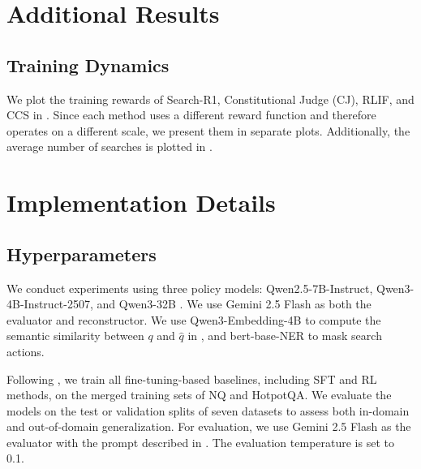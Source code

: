 \appendix
\section{Additional Results}

\subsection{Training Dynamics}

We plot the training rewards of Search-R1, Constitutional Judge (CJ), RLIF, and CCS in . Since each method uses a different reward function and therefore operates on a different scale, we present them in separate plots. Additionally, the average number of searches is plotted in .





\section{Implementation Details}
\label{appendix:implementaion_details}

\subsection{Hyperparameters}
\label{appendix:hyperparams}
We conduct experiments using three policy models: Qwen2.5-7B-Instruct, Qwen3-4B-Instruct-2507, and Qwen3-32B \citep{yang2025qwen3}. We use Gemini 2.5 Flash \citep{comanici2025gemini} as both the evaluator and reconstructor. We use Qwen3-Embedding-4B \citep{qwen3embedding} to compute the semantic similarity between $q$ and $\hat{q}$ in , and bert-base-NER \citep{bert-base-NER} to mask search actions.

Following \citet{search-r1}, we train all fine-tuning-based baselines, including SFT and RL methods, on the merged training sets of NQ and HotpotQA. We evaluate the models on the test or validation splits of seven datasets to assess both in-domain and out-of-domain generalization. For evaluation, we use Gemini 2.5 Flash as the evaluator with the prompt described in . The evaluation temperature is set to 0.1.

